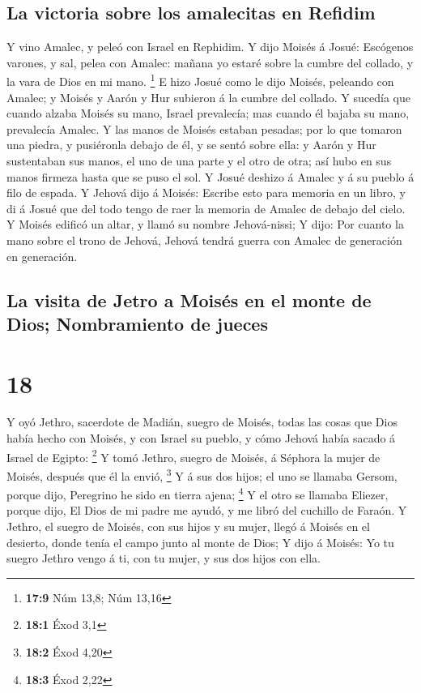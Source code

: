 \hypertarget{la-victoria-sobre-los-amalecitas-en-refidim}{%
\subsection{La victoria sobre los amalecitas en
Refidim}\label{la-victoria-sobre-los-amalecitas-en-refidim}}

 Y vino Amalec, y peleó con Israel en Rephidim.
 Y dijo Moisés á Josué: Escógenos varones, y sal, pelea
con Amalec: mañana yo estaré sobre la cumbre del collado, y la vara de
Dios en mi mano. \footnote{\textbf{17:9} Núm 13,8; Núm 13,16}
 E hizo Josué como le dijo Moisés, peleando con Amalec; y
Moisés y Aarón y Hur subieron á la cumbre del collado.  Y
sucedía que cuando alzaba Moisés su mano, Israel prevalecía; mas cuando
él bajaba su mano, prevalecía Amalec.  Y las manos de
Moisés estaban pesadas; por lo que tomaron una piedra, y pusiéronla
debajo de él, y se sentó sobre ella: y Aarón y Hur sustentaban sus
manos, el uno de una parte y el otro de otra; así hubo en sus manos
firmeza hasta que se puso el sol.  Y Josué deshizo á
Amalec y á su pueblo á filo de espada.  Y Jehová dijo á
Moisés: Escribe esto para memoria en un libro, y di á Josué que del todo
tengo de raer la memoria de Amalec de debajo del cielo. 
Y Moisés edificó un altar, y llamó su nombre Jehová-nissi;
 Y dijo: Por cuanto la mano sobre el trono de Jehová,
Jehová tendrá guerra con Amalec de generación en generación.

\hypertarget{la-visita-de-jetro-a-moisuxe9s-en-el-monte-de-dios-nombramiento-de-jueces}{%
\subsection{La visita de Jetro a Moisés en el monte de Dios;
Nombramiento de
jueces}\label{la-visita-de-jetro-a-moisuxe9s-en-el-monte-de-dios-nombramiento-de-jueces}}

\hypertarget{section-17}{%
\section{18}\label{section-17}}

 Y oyó Jethro, sacerdote de Madián, suegro de Moisés,
todas las cosas que Dios había hecho con Moisés, y con Israel su pueblo,
y cómo Jehová había sacado á Israel de Egipto: \footnote{\textbf{18:1}
  Éxod 3,1}  Y tomó Jethro, suegro de Moisés, á Séphora la
mujer de Moisés, después que él la envió, \footnote{\textbf{18:2} Éxod
  4,20}  Y á sus dos hijos; el uno se llamaba Gersom,
porque dijo, Peregrino he sido en tierra ajena; \footnote{\textbf{18:3}
  Éxod 2,22}  Y el otro se llamaba Eliezer, porque dijo,
El Dios de mi padre me ayudó, y me libró del cuchillo de Faraón.
 Y Jethro, el suegro de Moisés, con sus hijos y su mujer,
llegó á Moisés en el desierto, donde tenía el campo junto al monte de
Dios;  Y dijo á Moisés: Yo tu suegro Jethro vengo á ti,
con tu mujer, y sus dos hijos con ella.

